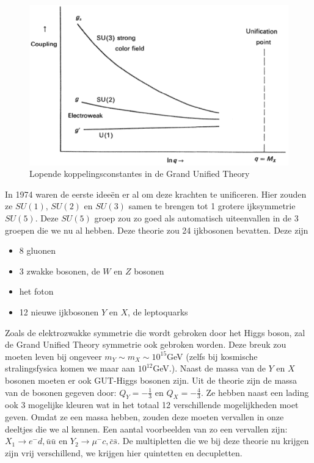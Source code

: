 \documentclass[../main.tex]{subfiles}
\begin{document}
\begin{figure}[h]
    \centering
    \includegraphics[width=0.5\linewidth]{physics_beyond_the_standard_model/grand_unified_theory.png}
    \caption{Lopende koppelingsconstantes in de Grand Unified Theory}%
    \label{fig:physics_beyond_the_standard_model/grand_unified_theory}
\end{figure}

In 1974 waren de eerste ideeën er al om deze krachten te unificeren. Hier zouden ze $SU(1)$, $SU(2)$ en $SU(3)$ samen te brengen tot 1 grotere ijksymmetrie $SU(5)$. Deze $SU(5)$ groep zou zo goed als automatisch uiteenvallen in de 3 groepen die we nu al hebben. Deze theorie zou 24 ijkbosonen bevatten. Deze zijn
\begin{itemize}
    \item 8 gluonen
    \item 3 zwakke bosonen, de $W$ en $Z$ bosonen
    \item het foton
    \item 12 nieuwe ijkbosonen $Y$ en $X$, de leptoquarks
\end{itemize}
Zoals de elektrozwakke symmetrie die wordt gebroken door het Higgs boson, zal de Grand Unified Theory symmetrie ook gebroken worden. Deze breuk zou moeten leven bij ongeveer $m_{Y} \sim m_{X} \sim 10^{15}$GeV (zelfs bij kosmische stralingsfysica komen we maar aan $10^{12}$GeV.). Naast de massa van de $Y$ en $X$ bosonen moeten er ook GUT-Higgs bosonen zijn. Uit de theorie zijn de massa van de bosonen gegeven door: $Q_{Y}=-\frac{1}{3}$ en $Q_{X}=-\frac{4}{3}$. Ze hebben naast een lading ook 3 mogelijke kleuren wat in het totaal 12 verschillende mogelijkheden moet geven. Omdat ze een massa hebben, zouden deze moeten vervallen in onze deeltjes die we al kennen. Een aantal voorbeelden van zo een vervallen zijn: $X_{1} \rightarrow e^{-} d, \bar{u} \bar{u}$ en $Y_{2} \rightarrow \mu^{-} c, \bar{c} \bar{s}$. De multipletten die we bij deze theorie nu krijgen zijn vrij verschillend, we krijgen hier quintetten en decupletten.
\end{document}
